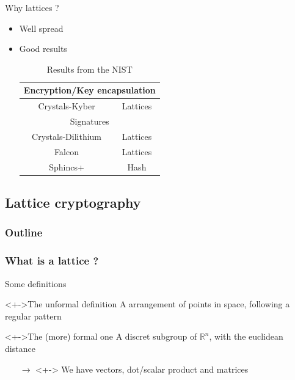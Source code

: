 \documentclass{beamer}
\begin{document}
\begin{frame}{Why lattices ?}
	\begin{itemize}
		\item Well spread
		\item Good results
			\begin{table}[h!]
			\begin{tabular}{|c|c|}
				\hline
				\multicolumn{2}{|c|}{Encryption/Key encapsulation} \\
				\hline
				Crystals-Kyber & Lattices \\
				\hline
				\multicolumn{2}{|c|}{Signatures} \\
				\hline
				Crystals-Dilithium & Lattices \\
				Falcon & Lattices \\
				Sphincs+ & Hash \\
				\hline
			\end{tabular}
			\caption{Results from the NIST}
			\end{table}
	\end{itemize}
\end{frame}

\subsection{Lattice cryptography}
\begin{frame}
  \frametitle{Outline}
\end{frame}

\subsubsection{What is a lattice ?}
\begin{frame}{Some definitions}
	\begin{block}<+->{The unformal definition}
		A arrangement of points in space, following a regular pattern
	\end{block}

	\begin{block}<+->{The (more) formal one}
		A discret subgroup of $\mathbb{R}^n$, with the euclidean distance
	\end{block}
	\begin{itemize}
		\item[$\rightarrow$]<+-> We have vectors, dot/scalar product and matrices
	\end{itemize}
\end{frame}
\end{document}

